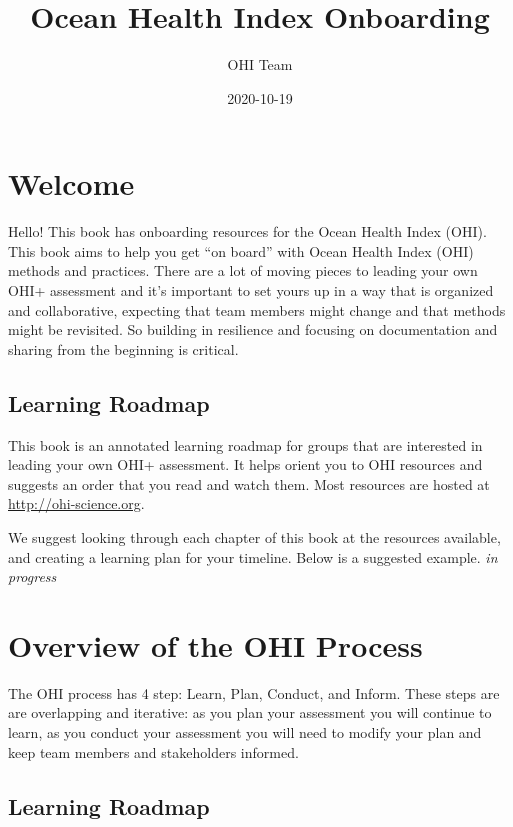 \documentclass[
]{book}
\title{Ocean Health Index Onboarding}
\author{OHI Team}
\date{2020-10-19}
\begin{document}
\maketitle

{
\setcounter{tocdepth}{1}
\tableofcontents
}
\hypertarget{welcome}{%
\chapter{Welcome}\label{welcome}}

Hello! This book has onboarding resources for the Ocean Health Index (OHI). This book aims to help you get ``on board'' with Ocean Health Index (OHI) methods and practices. There are a lot of moving pieces to leading your own OHI+ assessment and it's important to set yours up in a way that is organized and collaborative, expecting that team members might change and that methods might be revisited. So building in resilience and focusing on documentation and sharing from the beginning is critical.

\hypertarget{learning-roadmap}{%
\section{Learning Roadmap}\label{learning-roadmap}}

This book is an annotated learning roadmap for groups that are interested in leading your own OHI+ assessment. It helps orient you to OHI resources and suggests an order that you read and watch them. Most resources are hosted at \url{http://ohi-science.org}.

We suggest looking through each chapter of this book at the resources available, and creating a learning plan for your timeline. Below is a suggested example. \emph{in progress}

\hypertarget{process}{%
\chapter{Overview of the OHI Process}\label{process}}

The OHI process has 4 step: Learn, Plan, Conduct, and Inform. These steps are are overlapping and iterative: as you plan your assessment you will continue to learn, as you conduct your assessment you will need to modify your plan and keep team members and stakeholders informed.

\hypertarget{learning-roadmap}{%
\section{Learning Roadmap}\label{learning-roadmap}}
\end{document}
